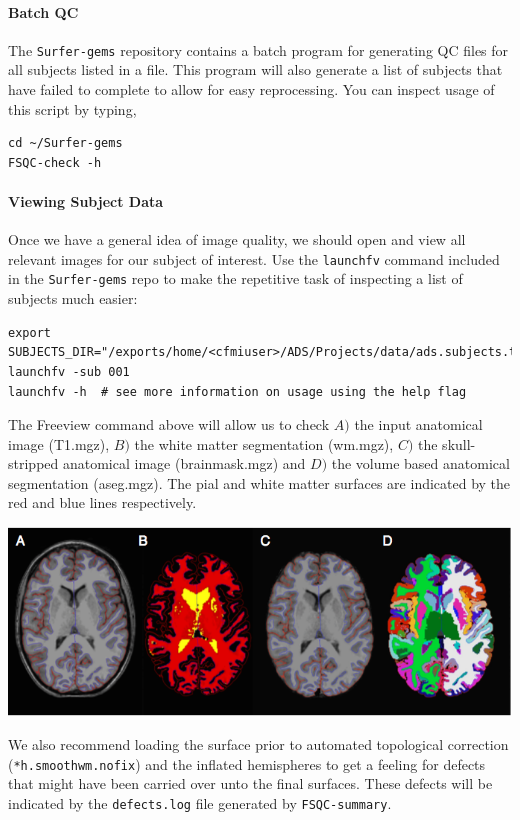 \documentclass[paper=a4, fontsize=11pt]{scrartcl} %
\numberwithin{equation}{section} %
\numberwithin{figure}{section} %
\numberwithin{table}{section} %
\begin{document}
\paragraph{Batch QC}  The \texttt{Surfer-gems} repository contains a batch program for generating QC files for all subjects listed in a file.  This program will also generate a list of subjects that have failed to complete to allow for easy reprocessing.  You can inspect usage of this script by typing,

\begin{lstlisting}
cd ~/Surfer-gems
FSQC-check -h
\end{lstlisting}

\paragraph{Viewing Subject Data} Once we have a general idea of image quality, we should open and view all relevant images for our subject of interest. Use the \texttt{launchfv} command included in the \texttt{Surfer-gems} repo to make the repetitive task of inspecting a list of subjects much easier:
\newpage
\begin{lstlisting}
export SUBJECTS_DIR="/exports/home/<cfmiuser>/ADS/Projects/data/ads.subjects.tutorial"
launchfv -sub 001
launchfv -h  # see more information on usage using the help flag
\end{lstlisting}

The Freeview command above will allow us to check $A)$ the input anatomical image (T1.mgz), $B)$ the white matter segmentation (wm.mgz), $C)$ the skull-stripped anatomical image (brainmask.mgz) and $D)$ the volume based anatomical segmentation (aseg.mgz).  The pial and white matter surfaces are indicated by the red and blue lines respectively.  

\includegraphics[scale=0.6]{check.png}

We also recommend loading the surface prior to automated topological correction (\texttt{*h.smoothwm.nofix}) and the inflated hemispheres to get a feeling for defects that might have been carried over unto the final surfaces.  These defects will be indicated by the \texttt{defects.log} file generated by \texttt{FSQC-summary}.
\end{document}
